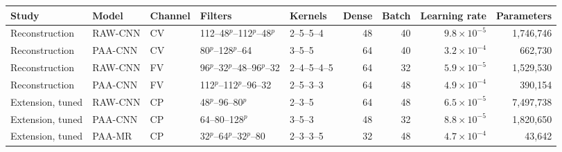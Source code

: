 \begin{tabular}{lllllrrrr}
\toprule
Study & Model & Channel & Filters & Kernels & Dense & Batch & Learning rate & Parameters \\
\midrule
Reconstruction & RAW-CNN & CV & 112--48$^{p}$--112$^{p}$--48$^{p}$ & 2--5--5--4 & 48 & 40 & $9.8\times10^{-5}$ & 1,746,746 \\
Reconstruction & PAA-CNN & CV & 80$^{p}$--128$^{p}$--64 & 3--5--5 & 64 & 40 & $3.2\times10^{-4}$ & 662,730 \\
Reconstruction & RAW-CNN & FV & 96$^{p}$--32$^{p}$--48--96$^{p}$--32 & 2--4--5--4--5 & 64 & 32 & $5.9\times10^{-5}$ & 1,529,530 \\
Reconstruction & PAA-CNN & FV & 112$^{p}$--112$^{p}$--96--32 & 2--5--3--3 & 64 & 48 & $4.9\times10^{-4}$ & 390,154 \\
Extension, tuned & RAW-CNN & CP & 48$^{p}$--96--80$^{p}$ & 2--3--5 & 64 & 48 & $6.5\times10^{-5}$ & 7,497,738 \\
Extension, tuned & PAA-CNN & CP & 64--80--128$^{p}$ & 3--5--3 & 48 & 32 & $8.8\times10^{-5}$ & 1,820,650 \\
Extension, tuned & PAA-MR & CP & 32$^{p}$--64$^{p}$--32$^{p}$--80 & 2--3--3--5 & 32 & 48 & $4.7\times10^{-4}$ & 43,642 \\
\bottomrule
\end{tabular}
